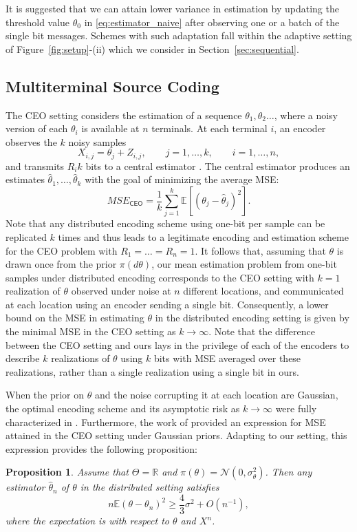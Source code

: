 \documentclass[letterpaper, 11pt]{IEEEtran}      %
\newtheorem{prop}[thm]{\bf {Proposition}}
\newcommand{\CEO}{\mathsf{CEO}}
\newcommand{\Ncal}{\mathcal{N}}
\begin{document}
It is suggested that we can attain lower variance in estimation by updating the threshold value $\theta_0$ in \eqref{eq:estimator_naive} after observing one or a batch of the single bit messages. Schemes with such adaptation fall within the adaptive setting of Figure~\ref{fig:setup}-(ii) which we consider in Section~\ref{sec:sequential}. \\

\subsection{Multiterminal Source Coding \label{sec:ceo}}
The CEO setting considers the estimation of a sequence $\theta_1,\theta_2\ldots$, where a noisy version of each $\theta_i$ is available at $n$ terminals. At each terminal $i$, an encoder observes the $k$ noisy samples
\[
X_{i,j} = \theta_j + Z_{i,j},\qquad j=1,\ldots,k, \qquad i = 1,\ldots,n,
\]
and transmits $R_i k$ bits to a central estimator  \cite{berger1996ceo}. The central estimator produces an estimates $\hat{\theta}_1,\ldots,\hat{\theta}_k$ with the goal of minimizing the average MSE:
\[
MSE_{\CEO} = \frac{1}{k} \sum_{j=1}^k \mathbb E \left[\left(\theta_j - \hat{\theta}_j \right)^2 \right]. 
\]
Note that any distributed encoding scheme using one-bit per sample can be replicated $k$ times and thus leads to a legitimate encoding and estimation scheme for the CEO problem with $R_1=\ldots=R_n = 1$. It follows that, assuming that $\theta$ is drawn once from the prior $\pi(d\theta)$, our mean estimation problem from one-bit samples under distributed encoding corresponds to the CEO setting with $k=1$ realization of $\theta$ observed under noise at $n$ different locations, and communicated at each location using an encoder sending a single bit. 
%
Consequently, a lower bound on the MSE in estimating $\theta$ in the distributed encoding setting is given by the minimal MSE in the CEO setting as $k \to \infty$. Note that the difference between the CEO setting and ours lays in the privilege of each of the encoders to describe $k$ realizations of $\theta$ using $k$ bits with MSE averaged over these realizations, rather than a single realization using a single bit in ours. 
 \par
When the prior on $\theta$ and the noise corrupting it at each location are Gaussian, the optimal encoding scheme and its asymptotic risk as $k\to \infty$ were fully characterized in \cite{prabhakaran2004rate}. Furthermore, the work of \cite{chen2004upper} provided an expression for MSE attained in the CEO setting under Gaussian priors. Adapting to our setting, this expression provides the following proposition:
\begin{prop} \label{prop:ceo_lower_bound}
Assume that $\Theta = \mathbb R$ and $\pi(\theta) = \Ncal(0,\sigma_\theta^2)$. Then any estimator $\hat{\theta}_n$ of $\theta$ in the distributed setting satisfies
\begin{equation} \label{eq:ceo_bound}
 n\mathbb E \left( \theta - \theta_n \right)^2 \geq \frac{4}{3} \sigma^2 + O(n^{-1}),
\end{equation}
where the expectation is with respect to $\theta$ and $X^n$.
\end{prop}
\end{document}
